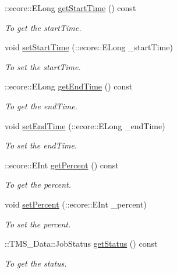\begin{DoxyCompactItemize}
::ecore::ELong \hyperlink{classTMS__Data_1_1Progression_a05dfa53916664a3f790c418d52372052}{getStartTime} () const 
\begin{DoxyCompactList}\small\item\em To get the startTime. \item\end{DoxyCompactList}\item 
void \hyperlink{classTMS__Data_1_1Progression_a1518a15cc05e2494b4d765e18d06b475}{setStartTime} (::ecore::ELong \_\-startTime)
\begin{DoxyCompactList}\small\item\em To set the startTime. \item\end{DoxyCompactList}\item 
::ecore::ELong \hyperlink{classTMS__Data_1_1Progression_ae2306b8f56d54fcd9de41081956473c9}{getEndTime} () const 
\begin{DoxyCompactList}\small\item\em To get the endTime. \item\end{DoxyCompactList}\item 
void \hyperlink{classTMS__Data_1_1Progression_adc11fdc38d0da4e580708793f37fa8d9}{setEndTime} (::ecore::ELong \_\-endTime)
\begin{DoxyCompactList}\small\item\em To set the endTime. \item\end{DoxyCompactList}\item 
::ecore::EInt \hyperlink{classTMS__Data_1_1Progression_a42a2b1658113b2dba8abfb5b799e4d10}{getPercent} () const 
\begin{DoxyCompactList}\small\item\em To get the percent. \item\end{DoxyCompactList}\item 
void \hyperlink{classTMS__Data_1_1Progression_a87606c753ceea3e6a75b35ecf3f291e9}{setPercent} (::ecore::EInt \_\-percent)
\begin{DoxyCompactList}\small\item\em To set the percent. \item\end{DoxyCompactList}\item 
::TMS\_\-Data::JobStatus \hyperlink{classTMS__Data_1_1Progression_a0b1bee5539b816a1d14476a3673fc28b}{getStatus} () const 
\begin{DoxyCompactList}\small\item\em To get the status. \item\end{DoxyCompactList}\item 

\end{DoxyCompactItemize}
